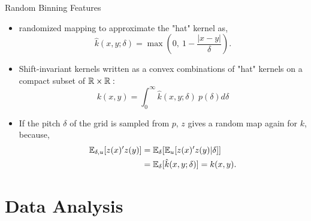 \documentclass[unknownkeysallowed]{beamer}
\begin{document}
\begin{frame}{Random Binning Features}
\begin{itemize}
    \item randomized mapping to approximate the "hat" kernel as,
        \begin{equation*}
        \hat{k}(x,y; \delta) = \max \left(0,\ 1-\frac{|x-y|}{\delta} \right).
        \end{equation*}
    \item Shift-invariant kernels written as a convex combinations of "hat" kernels on a compact subset of $\mathbb{R} \times \mathbb{R}:$
        \begin{equation*}
            k(x,y) = \int_0^{\infty} \hat{k}(x,y;\delta)\ p(\delta) d\delta
        \end{equation*}
    \item If the pitch $\delta$ of the grid is sampled from $p$, $z$ gives a random map again for $k$, because,
            \begin{align*}
                \mathbb{E}_{\delta, u}[z(x)'z(y)] &= \mathbb{E}_{\delta}[\mathbb{E}_u[z(x)'z(y) | \delta]]\\
                &= \mathbb{E}_{\delta}[\hat{k}(x,y;\delta)] = k(x,y).
            \end{align*}
\end{itemize}
\end{frame}

\section{Data Analysis}
\label{sec:Data Analysis}
\end{document}
